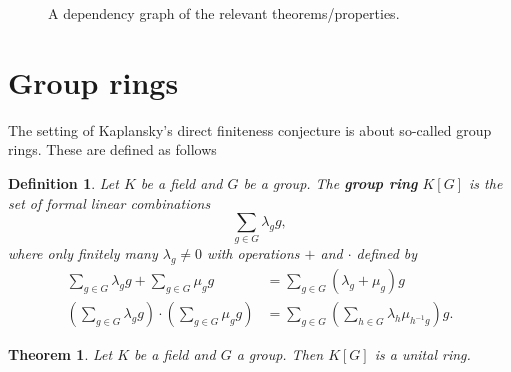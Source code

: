 \documentclass[titlepage, a4paper]{article}
\newtheorem{theorem}{Theorem}
\newtheorem{definition}{Definition}
\theoremstyle{remark}
\begin{document}
\begin{figure}[h]
	\centering
{}
\caption{A dependency graph of the relevant theorems/properties. }
\end{figure}
\section{Group rings}\label{sec:group_rings}

The setting of Kaplansky's direct finiteness conjecture is about so-called group rings. These are defined as follows


\begin{definition}\label{def:group_ring}
	Let $K$ be a field and $G$ be a group. The \textbf{group ring} $K[G]$ is the set of formal linear combinations
    \[
        \sum_{g \in G} \lambda_g g,
    \]
    where only finitely many $\lambda_g \neq 0$ with operations $+$ and $\cdot$ defined by
    \begin{align*}
        \sum_{g \in G} \lambda_g g + \sum_{g \in G} \mu_g g
        &= \sum_{g \in G} (\lambda_g+\mu_g) g \\
        \left(\sum_{g \in G} \lambda_g g \right) \cdot \left(\sum_{g \in G} \mu_g g \right)
        &= \sum_{g \in G} \left( \sum_{h \in G} \lambda_{h} \mu_{h^{-1}g} \right) g.
    \end{align*}
\end{definition}


\begin{theorem}
    Let $K$ be a field and $G$ a group. Then $K[G]$ is a unital ring.
\end{theorem}
\end{document}
